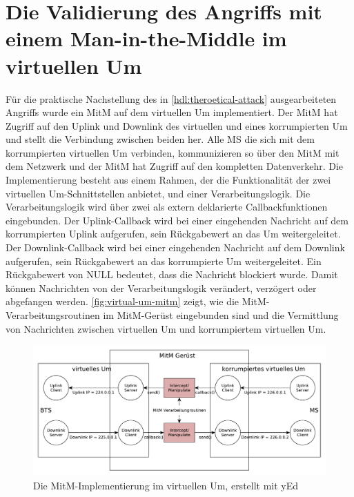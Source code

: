 \section{Die Validierung des Angriffs mit einem Man-in-the-Middle im virtuellen Um}\label{hdl:mitm_impl}

Für die praktische Nachstellung des in \autoref{hdl:theroetical-attack} ausgearbeiteten Angriffs wurde ein \ac{MitM} auf dem virtuellen \ac{Um} implementiert. Der \ac{MitM} hat Zugriff auf den Uplink und Downlink des virtuellen und eines korrumpierten \ac{Um} und stellt die Verbindung zwischen beiden her. Alle \ac{MS} die sich mit dem korrumpierten virtuellen \ac{Um} verbinden, kommunizieren so über den \ac{MitM} mit dem Netzwerk und der \ac{MitM} hat Zugriff auf den kompletten Datenverkehr. Die Implementierung besteht aus einem Rahmen, der die Funktionalität der zwei virtuellen \ac{Um}-Schnittstellen anbietet, und einer Verarbeitungslogik. Die Verarbeitungslogik wird über zwei als extern deklarierte Callbackfunktionen eingebunden. Der Uplink-Callback wird bei einer eingehenden Nachricht auf dem korrumpierten Uplink aufgerufen, sein Rückgabewert an das \ac{Um} weitergeleitet. Der Downlink-Callback wird bei einer eingehenden Nachricht auf dem Downlink aufgerufen, sein Rückgabewert an das korrumpierte \ac{Um} weitergeleitet. Ein Rückgabewert von NULL bedeutet, dass die Nachricht blockiert wurde. Damit können Nachrichten von der Verarbeitungslogik verändert, verzögert oder abgefangen werden. \autoref{fig:virtual-um-mitm} zeigt, wie die \ac{MitM}-Verarbeitungsroutinen im \ac{MitM}-Gerüst eingebunden sind und die Vermittlung von Nachrichten zwischen virtuellen \ac{Um} und korrumpiertem virtuellen \ac{Um}.

\begin{figure}[H]
	\centering \includegraphics[width=1.0\textwidth]{figures/mitm_in_virt_um_with_multicast.pdf}
	\caption[Die MitM-Implementierung im virtuellen Um]{Die \ac{MitM}-Implementierung im virtuellen \ac{Um}, erstellt mit yEd} \label{fig:virtual-um-mitm}
\end{figure}

